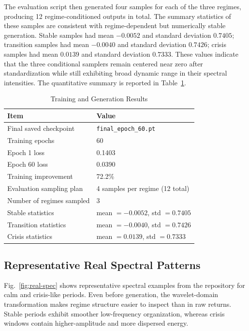 \documentclass[conference]{IEEEtran}
\begin{document}
The evaluation script then generated four samples for each of the three regimes, producing 12 regime-conditioned outputs in total. The summary statistics of these samples are consistent with regime-dependent but numerically stable generation. Stable samples had mean $-0.0052$ and standard deviation $0.7405$; transition samples had mean $-0.0040$ and standard deviation $0.7426$; crisis samples had mean $0.0139$ and standard deviation $0.7333$. These values indicate that the three conditional samplers remain centered near zero after standardization while still exhibiting broad dynamic range in their spectral intensities. The quantitative summary is reported in Table~\ref{tab:results-summary}.

\begin{table}[!t]
\caption{Training and Generation Results}
\label{tab:results-summary}
\centering
\begin{tabular}{>{\raggedright\arraybackslash}p{3.0cm} p{4.45cm}}
\toprule
Item & Value \\
\midrule
Final saved checkpoint & \texttt{final\_epoch\_60.pt} \\
Training epochs & 60 \\
Epoch 1 loss & 0.1403 \\
Epoch 60 loss & 0.0390 \\
Training improvement & 72.2\% \\
Evaluation sampling plan & 4 samples per regime (12 total) \\
Number of regimes sampled & 3 \\
Stable statistics & mean $=-0.0052$, std $=0.7405$ \\
Transition statistics & mean $=-0.0040$, std $=0.7426$ \\
Crisis statistics & mean $=0.0139$, std $=0.7333$ \\
\bottomrule
\end{tabular}
\end{table}

\subsection{Representative Real Spectral Patterns}
Fig.~\ref{fig:real-spec} shows representative spectral examples from the repository for calm and crisis-like periods. Even before generation, the wavelet-domain transformation makes regime structure easier to inspect than in raw returns. Stable periods exhibit smoother low-frequency organization, whereas crisis windows contain higher-amplitude and more dispersed energy.
\end{document}
